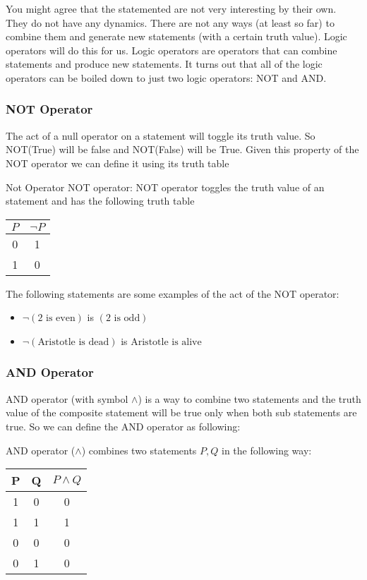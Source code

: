 You might agree that the statemented are not very interesting by their own. They do not have any dynamics. There are not any ways (at least so far) to combine them and generate new statements (with a certain truth value). Logic operators will do this for us. Logic operators are operators that can combine statements and produce new statements. It turns out that all of the logic operators can be boiled down to just two logic operators: NOT and AND.

\subsubsection{NOT Operator}
The act of a null operator on a statement will toggle its truth value. So NOT(True) will be false and NOT(False) will be True. Given this property of the NOT operator we can define it using its truth table

\begin{defbox}{Not Operator}
	NOT operator: NOT operator toggles the truth value of an statement and has the following truth table
	\begin{center}
		\begin{tabular}{|c|c|}
		\hline
		$ P $ & $ \neg P $ \\
		\hline
		0 & 1 \\
		\hline
		1 & 0 \\
		\hline
		\end{tabular}
	\end{center}
\end{defbox}

The following statements are some examples of the act of the NOT operator:

\begin{itemize}
	\item $ \neg (\text{2 is even} )$ is $ (\text{2 is odd}) $
	\item $ \neg (\text{Aristotle is dead}) $ is $ \text{Aristotle is alive} $
\end{itemize}


\subsubsection{AND Operator}
AND operator (with symbol $ \wedge $) is a way to combine two statements and the truth value of the composite statement will be true only when both sub statements are true. So we can define the AND operator as following:

\begin{defbox}
	AND operator ($ \wedge $) combines two statements $ P, Q $ in the following way:
	\begin{center}
		\begin{tabular}{|c|c|c|}
			\hline
			P & Q & $ P \wedge Q $ \\
			\hline
			1 & 0 & 0 \\
			\hline
			1 & 1 & 1 \\
			\hline
			0 & 0 & 0 \\
			\hline
			0 & 1 & 0 \\
			\hline
		\end{tabular}
	\end{center}
\end{defbox}

